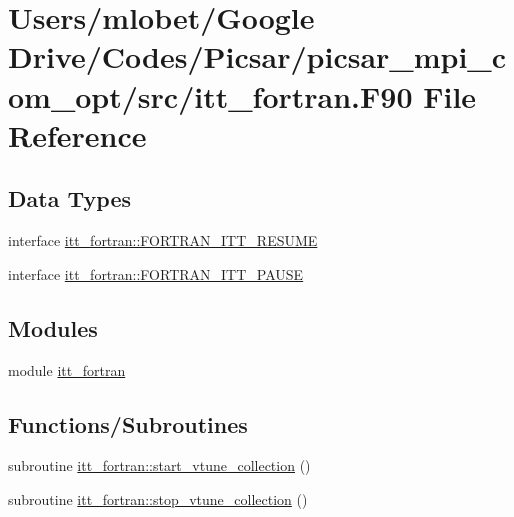 \hypertarget{itt__fortran_8_f90}{}\section{Users/mlobet/\+Google Drive/\+Codes/\+Picsar/picsar\+\_\+mpi\+\_\+com\+\_\+opt/src/itt\+\_\+fortran.F90 File Reference}
\label{itt__fortran_8_f90}
\subsection*{Data Types}
\begin{DoxyCompactItemize}
\item 
interface \hyperlink{interfaceitt__fortran_1_1_f_o_r_t_r_a_n___i_t_t___r_e_s_u_m_e}{itt\+\_\+fortran\+::\+F\+O\+R\+T\+R\+A\+N\+\_\+\+I\+T\+T\+\_\+\+R\+E\+S\+U\+ME}
\item 
interface \hyperlink{interfaceitt__fortran_1_1_f_o_r_t_r_a_n___i_t_t___p_a_u_s_e}{itt\+\_\+fortran\+::\+F\+O\+R\+T\+R\+A\+N\+\_\+\+I\+T\+T\+\_\+\+P\+A\+U\+SE}
\end{DoxyCompactItemize}
\subsection*{Modules}
\begin{DoxyCompactItemize}
\item 
module \hyperlink{namespaceitt__fortran}{itt\+\_\+fortran}
\end{DoxyCompactItemize}
\subsection*{Functions/\+Subroutines}
\begin{DoxyCompactItemize}
\item 
subroutine \hyperlink{namespaceitt__fortran_acf3de22a6f47725eb81e0b60d8618e88}{itt\+\_\+fortran\+::start\+\_\+vtune\+\_\+collection} ()
\item 
subroutine \hyperlink{namespaceitt__fortran_ab7a56a3c66bb870aa06f7534d10cfdcd}{itt\+\_\+fortran\+::stop\+\_\+vtune\+\_\+collection} ()
\end{DoxyCompactItemize}
